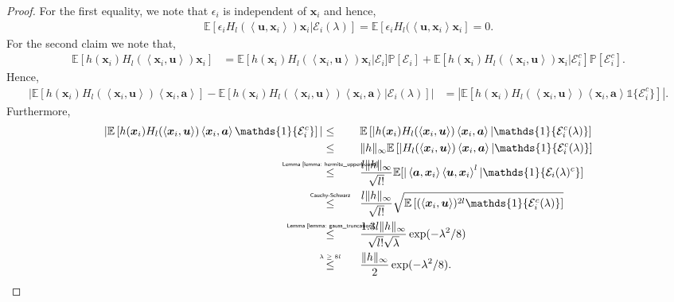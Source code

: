 \documentclass[final,12pt]{colt2018} %
\newcommand{\E}{\mathbb{E}}
\newcommand{\Prob}{\mathbb{P}}
\newcommand{\explain}[2]{\mathrel{\overset{\makebox[0pt]{\mbox{\normalfont\tiny\sffamily #1}}}{#2}}}
\renewcommand\v[1]{{\ensuremath{\boldsymbol{#1}}}}
\newcommand\ip[1]{\left\langle #1 \right\rangle}
\newcommand{\indicator}[1]{\mathds{1}\{#1\}}
\begin{document}
\begin{proof} For the first equality, we note that $\epsilon_i$ is independent of $\v x_i$ and hence,
\begin{align*}
    \E[ \epsilon_i H_l(\ip{\v u, \v x_i}) \v x_i | \mathcal{E}_i(\lambda)] = \E[ \epsilon_i H_l(\ip{\v u, \v x_i} \v x_i] = 0.
\end{align*}
For the second claim we note that,
\begin{align*}
     \E \left[ h(\v x_i) H_l(\ip{\v x_i, \v u}) \v x_i \right] & = \E \left[ h(\v x_i) H_l(\ip{\v x_i, \v u}) \v x_i \right | \mathcal{E}_i] \Prob[\mathcal{E}_i] + \E \left[ h(\v x_i) H_l(\ip{\v x_i, \v u}) \v x_i | \mathcal{E}_i^c \right] \Prob[\mathcal{E}_i^c].
\end{align*}
Hence, 
\begin{align*}
    \left| \E \left[ h(\v x_i) H_l(\ip{\v x_i, \v u}) \ip{\v x_i, \v a} \right] - \E \left[  h(\v x_i) H_l(\ip{\v x_i, \v u}) \ip{\v x_i, \v a} | \mathcal{E}_i(\lambda) \right]\right| & = |\E \left[  h(\v x_i) H_l(\ip{\v x_i, \v u}) \ip{\v x_i, \v a} \indicator{\mathcal{E}_i^c} \right]|.
\end{align*}
Furthermore,
\begin{align*}
    |\E \left[  h(\v x_i) H_l(\ip{\v x_i, \v u}) \ip{\v x_i, \v a} \indicator{\mathcal{E}_i^c} \right]| & \leq \qquad \E \left[ | h(\v x_i) H_l(\ip{\v x_i, \v u}) \ip{\v x_i, \v a} | \indicator{\mathcal{E}_i^c(\lambda)} \right] \\
    & \leq \qquad \|h\|_\infty \E \left[ |H_l(\ip{\v x_i, \v u}) \ip{\v x_i, \v a}| \indicator{\mathcal{E}_i^c(\lambda)} \right] \\
    & \explain{Lemma~\ref{lemma: hermite_upperbound}}{\leq} \qquad \frac{l\|h\|_\infty}{\sqrt{l!}} \E[|\ip{\v a,\v x_i} \ip{\v u, \v x_i}^l| \indicator{ \mathcal{E}_i(\lambda)^c}] \\
    & \explain{Cauchy-Schwarz}{\leq} \qquad \frac{l\|h\|_\infty}{\sqrt{l!}} \sqrt{\E \left[(\ip{\v x_i, \v u})^{2l} \indicator{\mathcal{E}_i^c(\lambda)} \right]} \\
    & \explain{Lemma~\ref{lemma: gauss_truncation}}{\leq} \qquad \frac{1.3l\|h\|_\infty}{\sqrt{l!}\sqrt{\lambda}}\exp(-\lambda^2/8) \\
    & \explain{$\lambda \geq 8l$}{\leq} \qquad \frac{\|h\|_\infty}{2} \exp(-\lambda^2/8).
\end{align*}
\end{proof}
\end{document}
